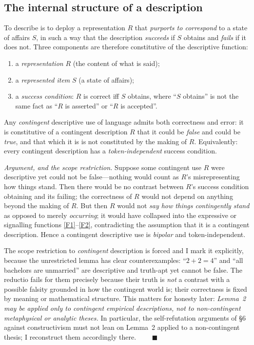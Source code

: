 \documentclass[12pt]{article}
\begin{document}
\subsection{The internal structure of a description}

To describe is to deploy a representation $R$ that \emph{purports to
correspond} to a state of affairs $S$, in such a way that the description
\emph{succeeds} if $S$ obtains and \emph{fails} if it does not. Three
components are therefore constitutive of the descriptive function:

\begin{enumerate}[label=(\roman*),leftmargin=2.2em]
\item a \emph{representation} $R$ (the content of what is said);
\item a \emph{represented item} $S$ (a state of affairs);
\item a \emph{success condition}: $R$ is correct iff $S$ obtains, where
``$S$ obtains'' is not the same fact as ``$R$ is asserted'' or ``$R$ is
accepted''.
\end{enumerate}

\begin{description}[leftmargin=1.6em,style=nextline]
\item[Lemma 2 (Bipolarity / the possibility of error, scoped).] Any
\emph{contingent} descriptive use of language admits both correctness and
error: it is constitutive of a contingent description $R$ that it could be
\emph{false} and could be \emph{true}, and that which it is is not
constituted by the making of $R$. Equivalently: every contingent
description has a \emph{token-independent} success condition.
\end{description}

\noindent\emph{Argument, and the scope restriction.} Suppose some
contingent use $R$ were descriptive yet could not be false---nothing would
count as $R$'s misrepresenting how things stand. Then there would be no
contrast between $R$'s success condition obtaining and its failing; the
correctness of $R$ would not depend on anything beyond the making of $R$.
But then $R$ would not \emph{say how things contingently stand} as opposed
to merely \emph{occurring}; it would have collapsed into the expressive or
signalling functions \ref{F1}--\ref{F2}, contradicting the assumption that
it is a contingent description. Hence a contingent descriptive use is
\emph{bipolar} and token-independent.

The scope restriction to \emph{contingent} description is forced and I
mark it explicitly, because the unrestricted lemma has clear
counterexamples: ``$2+2=4$'' and ``all bachelors are unmarried'' are
descriptive and truth-apt yet cannot be false. The reductio fails for
them precisely because their truth is \emph{not} a contrast with a
possible falsity grounded in how the contingent world is; their
correctness is fixed by meaning or mathematical structure. This matters
for honesty later: \emph{Lemma~2 may be applied only to contingent
empirical descriptions, not to non-contingent metaphysical or analytic
theses.} In particular, the self-refutation arguments of \S6 against
constructivism must not lean on Lemma~2 applied to a non-contingent
thesis; I reconstruct them accordingly there.
$\qquad\blacksquare$
\end{document}
